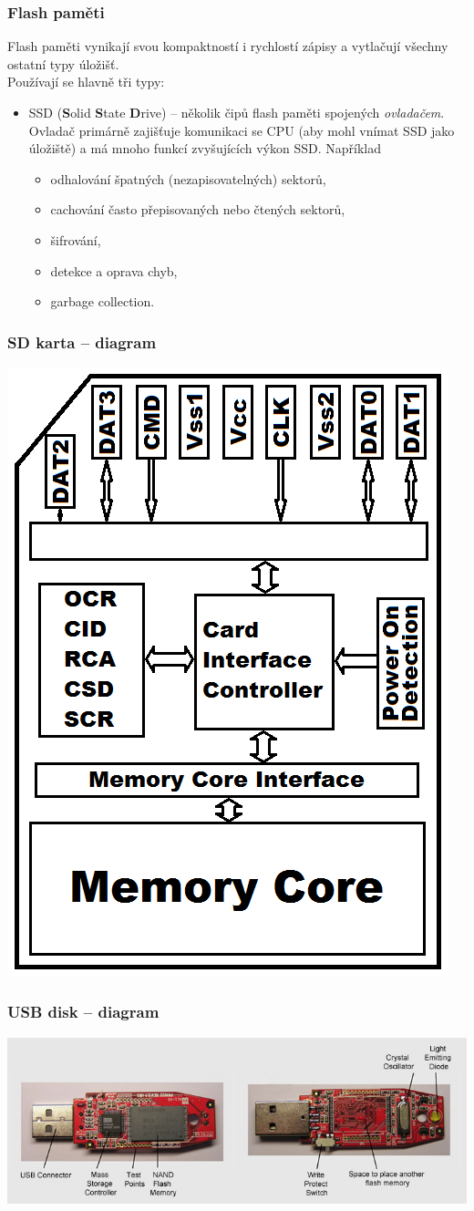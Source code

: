 \documentclass[aspectratio=169,11pt,svgnames,handout]{beamer}
\begin{document}
\begin{frame}
 \frametitle{Flash paměti}
 Flash paměti vynikají svou kompaktností i rychlostí zápisy a vytlačují všechny
 ostatní typy úložišť.\\
 Používají se hlavně tři typy:
 \begin{itemize}[label=\textbullet]
  \item SSD (\textbf{S}olid \textbf{S}tate \textbf{D}rive) -- několik čipů flash
   paměti spojených \emph{ovladačem}. Ovladač primárně zajišťuje komunikaci se
   CPU (aby mohl vnímat SSD jako  úložiště) a má mnoho funkcí
   zvyšujících výkon SSD. 
   \pause
   Například
   \begin{itemize}[label=\textemdash]
    \item odhalování špatných (nezapisovatelných) sektorů,
    \item cachování často přepisovaných nebo čtených sektorů,
    \item šifrování,
    \item detekce a oprava chyb,
    \item garbage collection.
   \end{itemize}
 \end{itemize}
\end{frame}

\begin{frame}
 \frametitle{SD karta -- diagram}
 \begin{center}
  \includegraphics[width=.4\textwidth,angle=-90,origin=c]{sd}
 \end{center}
\end{frame}

\begin{frame}
 \frametitle{USB disk -- diagram}
 \begin{center}
  \includegraphics[width=\textwidth]{usb}
 \end{center}
\end{frame}
\end{document}

